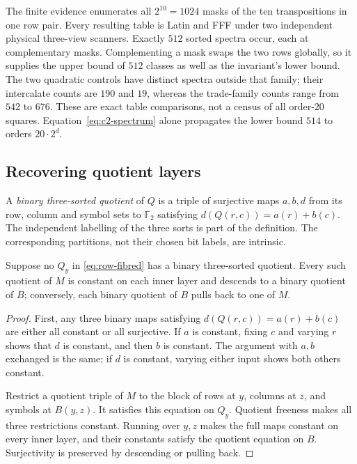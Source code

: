 The finite evidence enumerates all $2^{10}=1024$ masks of the ten
transpositions in one row pair. Every resulting table is Latin and FFF
under two independent physical three-view scanners. Exactly $512$
sorted spectra occur, each at complementary masks. Complementing a
mask swaps the two rows globally, so it supplies the upper bound of
$512$ classes as well as the invariant's lower bound. The two quadratic
controls have distinct spectra outside that family; their intercalate
counts are $190$ and $19$, whereas the trade-family counts range from
$542$ to $676$. These are exact table comparisons, not a census of
all order-$20$ squares. Equation~\eqref{eq:c2-spectrum} alone propagates
the lower bound $514$ to orders $20\cdot2^d$.

\subsection{Recovering quotient layers}

A \emph{binary three-sorted quotient} of $Q$ is a triple of surjective
maps $a,b,d$ from its row, column and symbol sets to $\mathbb F_2$
satisfying $d(Q(r,c))=a(r)+b(c)$. The independent labelling of the
three sorts is part of the definition. The corresponding partitions,
not their chosen bit labels, are intrinsic.

\begin{lemma}
\label{lem:binary-descent}
Suppose no $Q_y$ in \eqref{eq:row-fibred} has a binary three-sorted
quotient. Every such quotient of $M$ is constant on each inner layer
and descends to a binary quotient of $B$; conversely, each binary
quotient of $B$ pulls back to one of $M$.
\end{lemma}

\begin{proof}
First, any three binary maps satisfying $d(Q(r,c))=a(r)+b(c)$
are either all constant or all surjective. If $a$ is constant,
fixing $c$ and varying $r$ shows that $d$ is constant, and then
$b$ is constant. The argument with $a,b$ exchanged is the same;
if $d$ is constant, varying either input shows both others constant.

Restrict a quotient triple of $M$ to the block of rows at $y$,
columns at $z$, and symbols at $B(y,z)$. It satisfies this equation
on $Q_y$. Quotient freeness makes all three restrictions constant.
Running over $y,z$ makes the full maps constant on every inner
layer, and their constants satisfy the quotient equation on $B$.
Surjectivity is preserved by descending or pulling back.
\end{proof}

